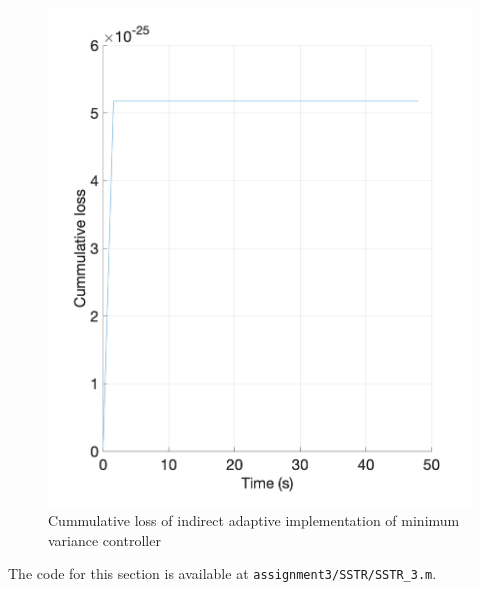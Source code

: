 \begin{figure}
	\centering
	\includegraphics[width=\textwidth]{images/sstr32.png}
	\caption{Cummulative loss of indirect adaptive implementation of minimum variance controller}
	\label{fig:sstr32}
\end{figure}

\noindent The code for this section is available at \lstinline|assignment3/SSTR/SSTR_3.m|. 
